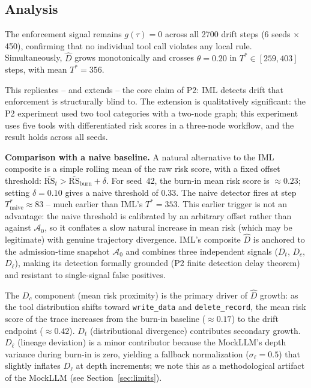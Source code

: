 \documentclass[11pt]{article}
\newcommand{\Azero}{\mathcal{A}_0}
\newcommand{\Dhat}{\widehat{D}}
\newcommand{\RS}{\mathrm{RS}}
\begin{document}
\subsection{Analysis}

The enforcement signal remains $g(\tau) = 0$ across all 2700 drift steps
(6 seeds $\times$ 450), confirming that no individual tool call violates
any local rule.
Simultaneously, $\Dhat$ grows monotonically and crosses $\theta=0.20$ in
$T^* \in [259, 403]$ steps, with mean $T^* = 356$.

This replicates -- and extends -- the core claim of P2: IML detects drift
that enforcement is structurally blind to.
The extension is qualitatively significant: the P2 experiment used two
tool categories with a two-node graph; this experiment uses five tools with
differentiated risk scores in a three-node workflow, and the result holds
across all seeds.

\textbf{Comparison with a naive baseline.}
A natural alternative to the IML composite is a simple rolling mean of
the raw risk score, with a fixed offset threshold: $\bar{\RS}_t > \bar{\RS}_{\mathrm{burn}} + \delta$.
For seed~42, the burn-in mean risk score is $\approx 0.23$; setting $\delta = 0.10$
gives a naive threshold of $0.33$.
The naive detector fires at step $T^*_{\mathrm{naive}} \approx 83$ --
much earlier than IML's $T^* = 353$.
This earlier trigger is not an advantage: the naive threshold is calibrated
by an arbitrary offset rather than against $\Azero$, so it conflates
a slow natural increase in mean risk (which may be legitimate) with genuine
trajectory divergence.
IML's composite $\Dhat$ is anchored to the admission-time snapshot $\Azero$
and combines three independent signals ($D_t$, $D_c$, $D_\ell$),
making its detection formally grounded (P2 finite detection delay theorem)
and resistant to single-signal false positives.

The $D_c$ component (mean risk proximity) is the primary driver of $\Dhat$
growth: as the tool distribution shifts toward \texttt{write\_data} and
\texttt{delete\_record}, the mean risk score of the trace increases from
the burn-in baseline ($\approx 0.17$) to the drift endpoint ($\approx 0.42$).
$D_t$ (distributional divergence) contributes secondary growth.
$D_\ell$ (lineage deviation) is a minor contributor because the
MockLLM's depth variance during burn-in is zero, yielding a fallback
normalization ($\sigma_\ell = 0.5$) that slightly inflates $D_\ell$ at
depth increments; we note this as a methodological artifact of the
MockLLM (see Section~\ref{sec:limits}).
\end{document}
